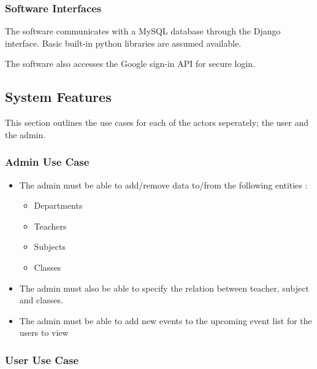 \subsubsection{Software Interfaces}
The software communicates with a MySQL database through the Django interface. Basic built-in python libraries are assumed available. 

The software also accesses the Google sign-in API for secure login.

\subsection{System Features}

This section outlines the use cases for each of the actors seperately; the user and the admin.

\subsubsection{Admin Use Case}

\begin{itemize}

\item The admin must be able to add/remove data to/from the following entities : 

\begin{itemize}
\item Departments
\item Teachers
\item Subjects
\item Classes
\end{itemize}

\item The admin must also be able to specify the relation between teacher, subject and classes.

\item The admin must be able to add new events to the upcoming event list for the users to view

\end{itemize}

\subsubsection{User Use Case}

